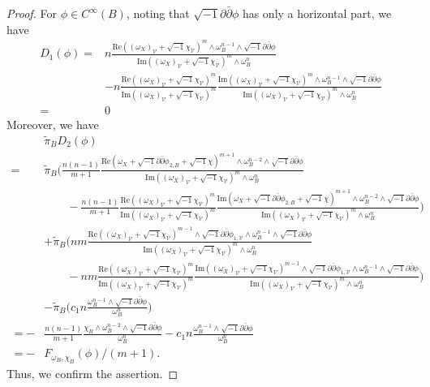 \documentclass[10pt,a4paper]{amsart}
\begin{document}
\begin{proof}
    For $\phi\in C^\infty(B)$, noting that $\sqrt{-1}\partial\bar{\partial}\phi$ has only a horizontal part, 
    we have
    \begin{align*}
        D_1(\phi)
        =&n\frac{\mathrm{Re}((\omega_X)_\mathcal{V}+\sqrt{-1}\chi_\mathcal{V})^m\wedge\omega_B^{n-1}\wedge\sqrt{-1}\partial\bar{\partial}\phi}{\mathrm{Im}((\omega_X)_\mathcal{V}+\sqrt{-1}\chi_\mathcal{V})^m\wedge\omega_B^n}\\
        &-n\frac{\mathrm{Re}((\omega_X)_\mathcal{V}+\sqrt{-1}\chi_\mathcal{V})^m}{\mathrm{Im}((\omega_X)_\mathcal{V}+\sqrt{-1}\chi_\mathcal{V})^m}\frac{\mathrm{Im}((\omega_X)_\mathcal{V}+\sqrt{-1}\chi_\mathcal{V})^m\wedge\omega_B^{n-1}\wedge\sqrt{-1}\partial\bar{\partial}\phi}{\mathrm{Im}((\omega_X)_\mathcal{V}+\sqrt{-1}\chi_\mathcal{V})^m\wedge\omega_B^n}\\
        =&0
    \end{align*}
    Moreover, we have
    \begin{align*}
        &\tilde{\pi}_BD_2(\phi)\\
        =&\tilde{\pi}_B\Biggl(\frac{n(n-1)}{m+1}\frac{\mathrm{Re}(\omega_X+\sqrt{-1}\partial\bar{\partial}\phi_{2,B}+\sqrt{-1}\chi)^{m+1}\wedge\omega_B^{n-2}\wedge\sqrt{-1}\partial\bar{\partial}\phi}{\mathrm{Im}((\omega_X)_\mathcal{V}+\sqrt{-1}\chi_\mathcal{V})^m\wedge\omega_B^n}\\
        &\qquad-\frac{n(n-1)}{m+1}\frac{\mathrm{Re}((\omega_X)_\mathcal{V}+\sqrt{-1}\chi_\mathcal{V})^m}{\mathrm{Im}((\omega_X)_\mathcal{V}+\sqrt{-1}\chi_\mathcal{V})^m}\frac{\mathrm{Im}(\omega_X+\sqrt{-1}\partial\bar{
        \partial}\phi_{2,B}+\sqrt{-1}\chi)^{m+1}\wedge\omega_B^{n-2}\wedge\sqrt{-1}\partial\bar{\partial}\phi}{\mathrm{Im}((\omega_X)_\mathcal{V}+\sqrt{-1}\chi_\mathcal{V})^m\wedge\omega_B^n}\Biggr)\\
        &+\tilde{\pi}_B\Biggl(nm\frac{\mathrm{Re}((\omega_X)_\mathcal{V}+\sqrt{-1}\chi_\mathcal{V})^{m-1}\wedge\sqrt{-1}\partial\bar{\partial}\phi_{1,\mathcal{V}}\wedge\omega_B^{n-1}\wedge\sqrt{-1}\partial\bar{\partial}\phi}{\mathrm{Im}((\omega_X)_\mathcal{V}+\sqrt{-1}\chi_\mathcal{V})^m\wedge\omega_B^n}\\
        &\qquad-nm\frac{\mathrm{Re}((\omega_X)_\mathcal{V}+\sqrt{-1}\chi_\mathcal{V})^m}{\mathrm{Im}((\omega_X)_\mathcal{V}+\sqrt{-1}\chi_\mathcal{V})^m}\frac{\mathrm{Im}((\omega_X)_\mathcal{V}+\sqrt{-1}\chi_\mathcal{V})^{m-1}\wedge
        \sqrt{-1}\partial\bar{\partial}\phi_{1,\mathcal{V}}\wedge\omega_B^{n-1}\wedge\sqrt{-1}\partial\bar{\partial}\phi}{\mathrm{Im}((\omega_X)_\mathcal{V}+\sqrt{-1}\chi_\mathcal{V})^m\wedge\omega_B^n}\Biggr)\\
        &-\tilde{\pi}_B\Biggl(c_1n\frac{\omega_B^{n-1}\wedge\sqrt{-1}\partial\bar{\partial}\phi}{\omega_B^n}\Biggr)\\
        =-&\frac{n(n-1)}{m+1}\frac{\chi_B\wedge\omega_B^{n-2}\wedge\sqrt{-1}\partial\bar{\partial}\phi}{\omega_B^n}-c_1n\frac{\omega_B^{n-1}\wedge\sqrt{-1}\partial\bar{\partial}\phi}{\omega_B^n}\\
        =-&F_{\omega_B,\chi_B}(\phi)/(m+1).
    \end{align*}
    Thus, we confirm the assertion.
\end{proof}
\end{document}
